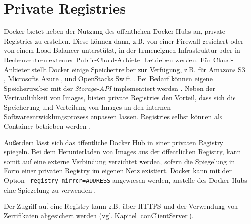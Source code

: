 \documentclass[../main.tex]{subfiles}
\begin{document}


  \section{Private Registries}
    Docker bietet neben der Nutzung des öffentlichen Docker Hubs an, private Registries zu erstellen. Diese können dann, z.B. von einer Firewall gesichert oder von einem Load-Balancer unterstützt, in der firmeneignen Infrastruktur oder in Rechenzentren externer Public-Cloud-Anbieter betrieben werden. Für Cloud-Anbieter stellt Docker einige Speichertreiber zur Verfügung, z.B. für Amazons S3 \cite{https://docs.docker.com/registry/storage-drivers/s3/}, Microsofts Azure \cite{https://docs.docker.com/registry/storage-drivers/azure/}, und OpenStacks Swift \cite{https://docs.docker.com/registry/storage-drivers/swift/}. Bei Bedarf können eigene Speichertreiber mit der \emph{Storage-API} implementiert werden \cite{https://docs.docker.com/registry/storagedrivers/}.
    Neben der Vertraulichkeit von Images, bieten private Registries den Vorteil, dass sich die Speicherung und Verteilung von Images an den internen Softwareentwicklungsprozess anpassen lassen. Registries selbst können als Container betrieben werden \cite{dockerRegistry}.

    Außerdem lässt sich das öffentliche Docker Hub in einer privaten Registry spiegeln. Bei dem Herunterladen von Images aus der öffentlichen Registry, kann somit auf eine externe Verbindung verzichtet werden, sofern die Spiegelung in Form einer privaten Registry im eigenen Netz existiert. Docker kann mit der Option \texttt{--registry-mirror=ADDRESS} angewiesen werden, anstelle des Docker Hubs eine Spiegelung zu verwenden \cite{https://docs.docker.com/registry/mirror/}.

    Der Zugriff auf eine Registry kann z.B. über \acrshort{HTTPS} und der Verwendung von Zertifikaten abgesichert werden \cite{dockerRegistry} (vgl. Kapitel \ref{conClientServer}).
\end{document}
